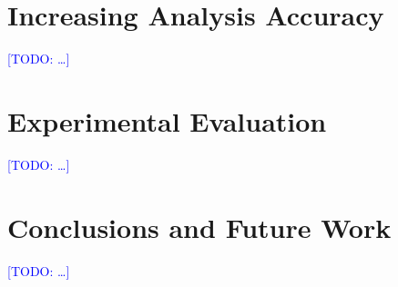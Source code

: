 \documentclass[runningheads]{llncs}
\newcommand{\todo}[1]{\textcolor{blue}{[TODO: #1]}}
\begin{document}

\section{Increasing Analysis Accuracy}

\todo{\ldots}

\section{Experimental Evaluation}

\todo{\ldots}

\section{Conclusions and Future Work}

\todo{\ldots}




\end{document}
